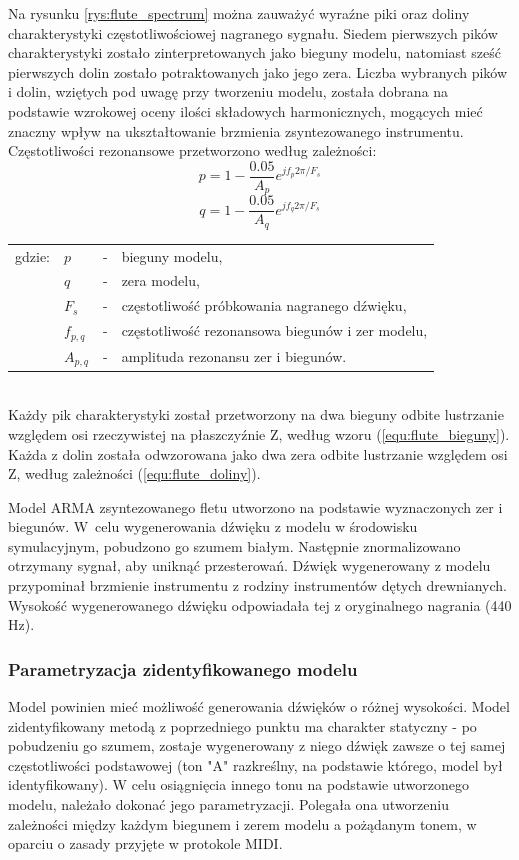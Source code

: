 Na rysunku \ref{rys:flute_spectrum} można zauważyć wyraźne piki oraz doliny charakterystyki częstotliwościowej nagranego sygnału. Siedem pierwszych pików charakterystyki zostało zinterpretowanych jako bieguny modelu, natomiast sześć pierwszych dolin zostało potraktowanych jako jego zera. Liczba wybranych pików i dolin, wziętych pod uwagę przy tworzeniu modelu, została dobrana na podstawie wzrokowej oceny ilości składowych harmonicznych, mogących mieć znaczny wpływ na ukształtowanie brzmienia zsyntezowanego instrumentu. Częstotliwości rezonansowe przetworzono według zależności:
\begin{equation} \label{equ:flute_bieguny}
p = 1-\frac{0.05}{A_{p}}e^{jf_{p}2\pi/F_{s}}
\end{equation}
\begin{equation} \label{equ:flute_doliny}
q = 1-\frac{0.05}{A_{q}}e^{jf_{q}2\pi/F_{s}}
\end{equation}
\begin{tabular}{ l l l l}
	gdzie: & $p$ &  - & bieguny modelu, \\
	&	$q$ & - &  zera modelu, \\
	&	$F_{s}$ & - &  częstotliwość próbkowania nagranego dźwięku,\\
	&	$f_{p,q}$ & - &  częstotliwość rezonansowa biegunów i zer modelu, \\
	&	$A_{p,q}$ & - &  amplituda rezonansu zer i biegunów. \\
\end{tabular} \\

Każdy pik charakterystyki został przetworzony na dwa bieguny odbite lustrzanie względem osi rzeczywistej na płaszczyźnie Z, według wzoru (\ref{equ:flute_bieguny}). Każda z dolin została odwzorowana jako dwa zera odbite lustrzanie względem osi Z, według zależności (\ref{equ:flute_doliny}).

Model ARMA zsyntezowanego fletu utworzono na podstawie wyznaczonych zer i biegunów. W~celu wygenerowania dźwięku z modelu w środowisku symulacyjnym, pobudzono go szumem białym. Następnie znormalizowano otrzymany sygnał, aby uniknąć przesterowań. Dźwięk wygenerowany z modelu przypominał brzmienie instrumentu z rodziny instrumentów dętych drewnianych. Wysokość wygenerowanego dźwięku odpowiadała tej z oryginalnego nagrania (440 Hz).

\subsubsection{Parametryzacja zidentyfikowanego modelu}
Model powinien mieć możliwość generowania dźwięków o różnej wysokości. Model zidentyfikowany metodą z poprzedniego punktu ma charakter statyczny - po pobudzeniu go szumem, zostaje wygenerowany z niego dźwięk zawsze o tej samej częstotliwości podstawowej (ton "A" razkreślny, na podstawie którego, model był identyfikowany). W celu osiągnięcia innego tonu na podstawie utworzonego modelu, należało dokonać jego parametryzacji. Polegała ona utworzeniu zależności między każdym biegunem i zerem modelu a pożądanym tonem, w oparciu o zasady przyjęte w protokole MIDI.

